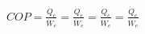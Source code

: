 \( COP = \frac{\dot{Q}_e}{\dot{W}_e} = \frac{\dot{Q}_e}{\dot{W}_e} = \frac{\dot{Q}_e}{\dot{W}_e} = \frac{\dot{Q}_e}{\dot{W}_e} \)